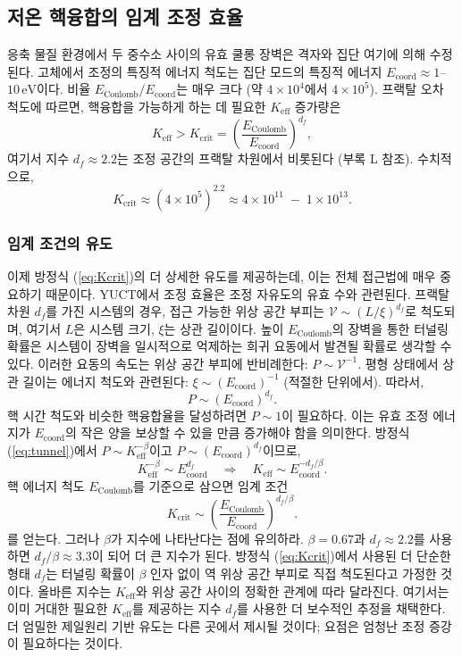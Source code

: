\documentclass[11pt,a4paper]{article}
\theoremstyle{remark}
\newcommand{\Keff}{K_{\mathrm{eff}}}
\newcommand{\df}{d_{\!f}}
\newcommand{\Kcrit}{K_{\mathrm{crit}}}
\begin{document}
	\subsection{저온 핵융합의 임계 조정 효율}
	
	응축 물질 환경에서 두 중수소 사이의 유효 쿨롱 장벽은 격자와 집단 여기에 의해 수정된다. 고체에서 조정의 특징적 에너지 척도는 집단 모드의 특징적 에너지 \(E_{\mathrm{coord}} \approx 1\)–\(10\,\text{eV}\)이다. 비율 \(E_{\text{Coulomb}}/E_{\mathrm{coord}}\)는 매우 크다 (약 \(4\times10^4\)에서 \(4\times10^5\)). 프랙탈 오차 척도에 따르면, 핵융합을 가능하게 하는 데 필요한 \(\Keff\) 증가량은
	\begin{equation}
		\Keff > \Kcrit = \left( \frac{E_{\text{Coulomb}}}{E_{\mathrm{coord}}} \right)^{\df},
		\label{eq:Kcrit}
	\end{equation}
	여기서 지수 \(\df \approx 2.2\)는 조정 공간의 프랙탈 차원에서 비롯된다 (부록 L 참조). 수치적으로,
	\[
	\Kcrit \approx (4\times10^5)^{2.2} \approx 4\times10^{11} \;-\; 1\times10^{13}.
	\]
	
	\subsubsection{임계 조건의 유도}
	
	이제 방정식 (\ref{eq:Kcrit})의 더 상세한 유도를 제공하는데, 이는 전체 접근법에 매우 중요하기 때문이다. YUCT에서 조정 효율은 조정 자유도의 유효 수와 관련된다. 프랙탈 차원 \(\df\)를 가진 시스템의 경우, 접근 가능한 위상 공간 부피는 \(\mathcal{V} \sim (L/\xi)^{\df}\)로 척도되며, 여기서 \(L\)은 시스템 크기, \(\xi\)는 상관 길이이다. 높이 \(E_{\text{Coulomb}}\)의 장벽을 통한 터널링 확률은 시스템이 장벽을 일시적으로 억제하는 희귀 요동에서 발견될 확률로 생각할 수 있다. 이러한 요동의 속도는 위상 공간 부피에 반비례한다: \(P \sim \mathcal{V}^{-1}\). 평형 상태에서 상관 길이는 에너지 척도와 관련된다: \(\xi \sim (E_{\mathrm{coord}})^{-1}\) (적절한 단위에서). 따라서,
	\[
	P \sim (E_{\mathrm{coord}})^{\df}.
	\]
	핵 시간 척도와 비슷한 핵융합율을 달성하려면 \(P \sim 1\)이 필요하다. 이는 유효 조정 에너지가 \(E_{\mathrm{coord}}\)의 작은 양을 보상할 수 있을 만큼 증가해야 함을 의미한다. 방정식 (\ref{eq:tunnel})에서 \(P \sim \Keff^{-\beta}\)이고 \(P \sim (E_{\mathrm{coord}})^{\df}\)이므로,
	\[
	\Keff^{-\beta} \sim E_{\mathrm{coord}}^{\df} \quad\Longrightarrow\quad \Keff \sim E_{\mathrm{coord}}^{-\df/\beta}.
	\]
	핵 에너지 척도 \(E_{\text{Coulomb}}\)를 기준으로 삼으면 임계 조건
	\[
	\Kcrit \sim \left( \frac{E_{\text{Coulomb}}}{E_{\mathrm{coord}}} \right)^{\df/\beta}.
	\]
	를 얻는다. 그러나 \(\beta\)가 지수에 나타난다는 점에 유의하라. \(\beta = 0.67\)과 \(\df \approx 2.2\)를 사용하면 \(\df/\beta \approx 3.3\)이 되어 더 큰 지수가 된다. 방정식 (\ref{eq:Kcrit})에서 사용된 더 단순한 형태 \(\df\)는 터널링 확률이 \(\beta\) 인자 없이 역 위상 공간 부피로 직접 척도된다고 가정한 것이다. 올바른 지수는 \(\Keff\)와 위상 공간 사이의 정확한 관계에 따라 달라진다. 여기서는 이미 거대한 필요한 \(\Keff\)를 제공하는 지수 \(\df\)를 사용한 더 보수적인 추정을 채택한다. 더 엄밀한 제일원리 기반 유도는 다른 곳에서 제시될 것이다; 요점은 엄청난 조정 증강이 필요하다는 것이다.
	
\end{document}
